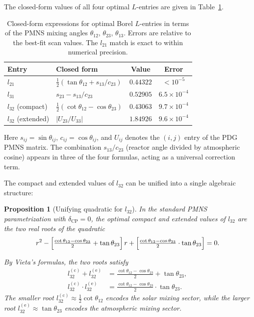 \documentclass[floatfix,aps,prd,twocolumn,showpacs,superscriptaddress,longbibliography]{revtex4-2}
\newtheorem{proposition}{Proposition}
\begin{document}
The closed-form values of all four optimal $L$-entries are
given in Table~\ref{tab:closed_form}.
 
\begin{table}[h]
\centering
\caption{Closed-form expressions for optimal Borel $L$-entries
in terms of the PMNS mixing angles
$\theta_{12}$, $\theta_{23}$, $\theta_{13}$.
Errors are relative to the best-fit scan values.
The $l_{21}$ match is exact to within numerical precision.}
\label{tab:closed_form}
\begin{tabular}{llcc}
\toprule
Entry & Closed form & Value & Error \\
\midrule
$l_{21}$          & $\tfrac{1}{2}(\tan\theta_{12} + s_{13}/c_{23})$
                  & $0.44322$ & $<10^{-5}$ \\
$l_{31}$          & $s_{23} - s_{13}/c_{23}$
                  & $0.52905$ & $6.5\times10^{-4}$ \\
$l_{32}$ (compact)  & $\tfrac{1}{2}(\cot\theta_{12} - \cos\theta_{23})$
                  & $0.43063$ & $9.7\times10^{-4}$ \\
$l_{32}$ (extended) & $|U_{23}/U_{33}|$
                  & $1.84926$ & $9.6\times10^{-4}$ \\
\bottomrule
\end{tabular}
\end{table}
 
\noindent
Here $s_{ij} = \sin\theta_{ij}$, $c_{ij} = \cos\theta_{ij}$,
and $U_{ij}$ denotes the $(i,j)$ entry of the PDG PMNS matrix.
The combination $s_{13}/c_{23}$ (reactor angle divided by
atmospheric cosine) appears in three of the four formulas,
acting as a universal correction term.
 
The compact and extended values of $l_{32}$ can be unified into a
single algebraic structure:
 
\begin{proposition}[Unifying quadratic for $l_{32}$]
\label{prop:quadratic}
In the standard PMNS parametrization with $\delta_{\mathrm{CP}} = 0$,
the optimal compact and extended values of $l_{32}$ are the two
real roots of the quadratic
\begin{equation}
\label{eq:quadratic}
r^2 - \Bigl[\tfrac{\cot\theta_{12} - \cos\theta_{23}}{2}
            + \tan\theta_{23}\Bigr]\,r
     + \Bigl[\tfrac{\cot\theta_{12} - \cos\theta_{23}}{2}
             \cdot \tan\theta_{23}\Bigr] = 0.
\end{equation}

By Vieta's formulas, the two roots satisfy
\begin{align}
l_{32}^{(\mathrm{c})} + l_{32}^{(\mathrm{e})}
  &= \tfrac{\cot\theta_{12} - \cos\theta_{23}}{2} + \tan\theta_{23},
  \label{eq:vieta_sum}\\
l_{32}^{(\mathrm{c})} \cdot l_{32}^{(\mathrm{e})}
  &= \tfrac{\cot\theta_{12} - \cos\theta_{23}}{2} \cdot \tan\theta_{23}.
  \label{eq:vieta_product}
\end{align}
The smaller root $l_{32}^{(\mathrm{c})} \approx \tfrac{1}{2}\cot\theta_{12}$
encodes the \emph{solar} mixing sector, while the larger root
$l_{32}^{(\mathrm{e})} \approx \tan\theta_{23}$ encodes the
\emph{atmospheric} mixing sector.
\end{proposition}
 
\end{document}
